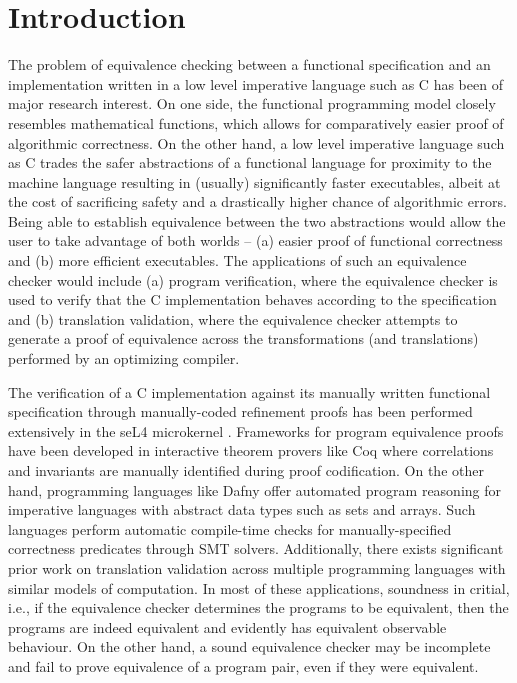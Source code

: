 \chapter{Introduction}
\label{sec:intro}
The problem of equivalence checking between a functional specification and an
implementation written in a low level imperative language such as C
has been of major research interest.
On one side, the functional programming model closely resembles mathematical functions,
which allows for comparatively easier proof of algorithmic correctness.
On the other hand, a low level imperative language such as C trades the safer abstractions of a functional
language for proximity to the machine language resulting in (usually) significantly faster executables, albeit at the cost of
sacrificing safety and a drastically higher chance of algorithmic errors.
Being able to establish equivalence between the two abstractions would allow the user
to take advantage of both worlds -- (a) easier proof of functional correctness and
(b) more efficient executables.
The applications of such an equivalence checker would include (a) program verification, where
the equivalence checker is used to verify that the C implementation
behaves according to the specification and (b) translation validation, where
the equivalence checker attempts to generate a proof of equivalence across
the transformations (and translations) performed by an optimizing compiler.

The verification of a C implementation against its manually written
functional specification through manually-coded refinement proofs has been
performed extensively in the seL4 microkernel \cite{seL4}.
Frameworks for program equivalence proofs have been developed in interactive
theorem provers like Coq \cite{programEquivalenceInCoq} where correlations and invariants
are manually identified during proof codification.
On the other hand, programming languages like Dafny \cite{dafny} offer automated program
reasoning for imperative languages with abstract data types such as sets and arrays.
Such languages perform automatic compile-time checks for manually-specified
correctness predicates through SMT solvers.
Additionally, there exists significant prior work on translation validation
\cite{tvi,tristan_tv_eqsat11,stepp_eqsat_llvm11,eqsat,pec,zuck03,zuck05,heffter05,covac,c_to_verilog,kanade09,lopes16,tvoc_cav05,ddec,semalign,oopsla20,tv_oskernel,namjoshi13}
across multiple programming languages with similar models of computation.
In most of these applications, soundness in critial,
i.e., if the equivalence checker determines the programs to be equivalent, then the programs are indeed equivalent
and evidently has equivalent observable behaviour. On the other hand, a sound equivalence checker may be incomplete
and fail to prove equivalence of a program pair, even if they were equivalent.

